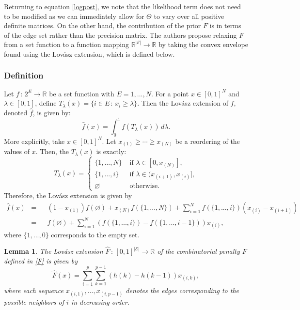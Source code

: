 \documentclass{uwstat572}
\newtheorem{lemma}[theorem]{Lemma}
\theoremstyle{remark}
\theoremstyle{definition}
\begin{document}
Returning to equation \eqref{logpost}, we note that the likelihood term does not need to be modified as we can immediately allow for $\Theta$ to vary over all positive definite matrices.  On the other hand, the contribution of the prior $F$ is in terms of the edge set rather than the precision matrix.  The authors propose relaxing $F$ from a set function to a function mapping $\mathbb{R}^{|\mathcal{E}|} \to \mathbb{R}$ by taking the convex envelope found using the Lov{\'a}sz extension, which is defined below.

\subsubsection{Definition}
Let $f \, : \, 2^E \to \mathbb{R}$ be a set function with $E = {1,...,N}$.  For a point $x \in [0,1]^N$ and $\lambda \in [0,1]$, define $T_{\lambda}(x) = \{i \in E \, : \, x_i \geq \lambda\}$.  Then the Lov{\'a}sz extension of $f$, denoted $\hat{f}$, is given by:
\begin{equation*}
\hat{f}(x) = \int_{0}^1 f( T_{\lambda}(x)) \, d\lambda.
\end{equation*}
More explicitly, take $x \in [0,1]^N$.  Let $x_{(1)} \geq \cdots \geq x_{(N)}$ be a reordering of the values of $x$.  Then, the $T_{\lambda}(x)$ is exactly:
\begin{equation*}
T_{\lambda}(x) = \begin{cases}
\{1,...,N\} & {\text{ if }} \lambda \in [0,x_{(N)}],
\\
\{1,...,i\} & {\text{ if }} \lambda \in (x_{(i+1)}, x_{(i)}],
\\
\varnothing & {\text{ otherwise}}.
\end{cases}
\end{equation*}
Therefore, the Lov{\'a}sz extension is given by
\begin{equation}\label{lovasz}
\begin{aligned}
\hat{f}(x) &= &&(1-x_{(1)}) f( \varnothing) + x_{(N)} f(\{1,...,N\})+ \sum_{i=1}^N f(\{1,...,i\})(x_{(i)} - x_{(i+1)}) 
\\
&= && f(\varnothing) + \sum_{i=1}^N (f(\{1,...,i\}) - f(\{1,...,i-1\})) x_{(i)},
\end{aligned}
\end{equation}
where $\{1,...,0\}$ corresponds to the empty set.

\begin{lemma}\label{Fextension}
The Lov{\'a}sz extension $\hat{F} \, : \, [0,1]^{|\mathcal{E}|} \to \mathbb{R}$ of the combinatorial penalty $F$ defined in \eqref{F} is given by
\begin{equation}
\hat{F}(x) = \sum_{i=1}^p \sum_{k=1}^{p-1} (h(k) - h(k-1)) x_{(i,k)},
\end{equation}
where each sequence $x_{(i,1)},...,x_{(i,p-1)}$ denotes the edges corresponding to the possible neighbors of $i$ in decreasing order.
\end{lemma}
\end{document}
